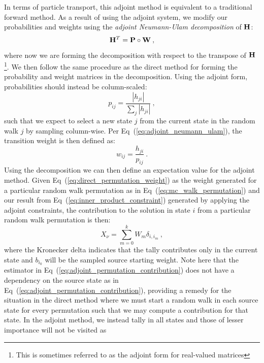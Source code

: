 In terms of particle transport, this adjoint method is equivalent to a
traditional forward method. As a result of using the adjoint system,
we modify our probabilities and weights using the \textit{adjoint
  Neumann-Ulam decomposition} of $\mathbf{H}$:
\begin{equation}
  \mathbf{H}^{T} = \mathbf{P} \circ \mathbf{W}\:,
  \label{eq:adjoint_neumann_ulam}
\end{equation}
where now we are forming the decomposition with respect to the
transpose of $\mathbf{H}$\footnote{This is sometimes referred to as the
  adjoint form for real-valued matrices}. We then follow the same
procedure as the direct method for forming the probability and weight
matrices in the decomposition. Using the adjoint form, probabilities
should instead be column-scaled:
\begin{equation}
  p_{ij} = \frac{|h_{ji}|}{\sum_j |h_{ji}|}\:,
  \label{eq:adjoint_probability}
\end{equation}
such that we expect to select a new state $j$ from the current state
in the random walk $j$ by sampling column-wise. Per
Eq~(\ref{eq:adjoint_neumann_ulam}), the transition weight is then
defined as:
\begin{equation}
  w_{ij} = \frac{h_{ji}}{p_{ij}}\:.
  \label{eq:adjoint_weight}
\end{equation}
Using the decomposition we can then define an expectation value for
the adjoint method. Given Eq~(\ref{eq:direct_permutation_weight}) as
the weight generated for a particular random walk permutation as in
Eq~(\ref{eq:mc_walk_permutation}) and our result from
Eq~(\ref{eq:inner_product_constraint}) generated by applying the
adjoint constraints, the contribution to the solution in state $i$
from a particular random walk permutation is then:
\begin{equation}
  X_{\nu} = \sum_{m=0}^k W_{m} \delta_{i,i_m}\:,
  \label{eq:adjoint_permutation_contribution}
\end{equation}
where the Kronecker delta indicates that the tally contributes only in
the current state and $b_{i_0}$ will be the sampled source starting
weight. Note here that the estimator in
Eq~(\ref{eq:adjoint_permutation_contribution}) does not have a
dependency on the source state as in
Eq~(\ref{eq:adjoint_permutation_contribution}), providing a remedy for
the situation in the direct method where we must start a random walk
in each source state for every permutation such that we may compute a
contribution for that state. In the adjoint method, we instead tally
in all states and those of lesser importance will not be visited as
